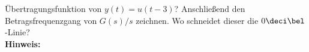 \begin{question}[section=3,name={Übertragungsfunktion},difficulty=5,type=mdl,tags={}]
	Übertragungsfunktion von $y(t) = u(t-3)$? Anschließend den Betragsfrequenzgang von $G(s)/s$ zeichnen. Wo schneidet dieser die $0\deci\bel$-Linie?
	\\ \textbf{Hinweis:}\\
	
\end{question}
\begin{solution}
	
\end{solution}